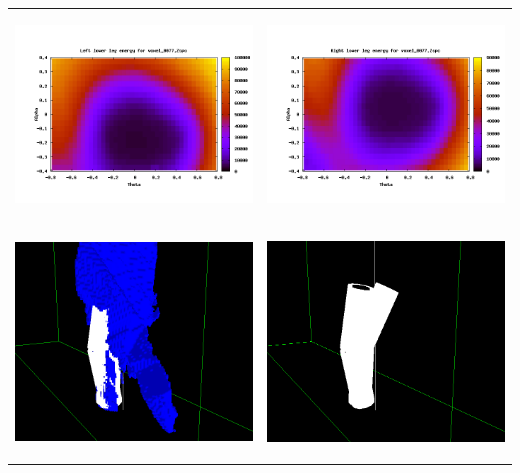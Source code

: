 \documentclass[12pt,a4paper]{article}
\begin{document}
\begin{tabular}{p{9cm} p{9cm}}
	\begin{center}\includegraphics[width=9cm]{badalpha-leftlower.png}\end{center}&
	\begin{center}\includegraphics[width=9cm]{badalpha-rightlower.png}\end{center}\\
	
	\begin{center}\includegraphics[width=7cm]{badalpha-3d.png}\end{center}&
	\begin{center}\includegraphics[width=7cm]{badalpha-model.png}\end{center}\\
\end{tabular}
\end{document}
